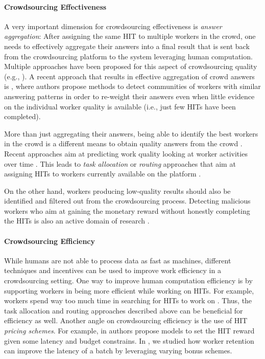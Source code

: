 \paragraph{Crowdsourcing Effectiveness}
A very important dimension for crowdsourcing effectiveness is \emph{answer aggregation}: After assigning the same HIT to multiple workers in the crowd, one needs to effectively aggregate their answers into a final result that is sent back from the crowdsourcing platform to the system leveraging human computation. Multiple approaches have been proposed for this aspect of crowdsourcing quality (e.g.,
\cite{Venanzi:2014:CBA:2566486.2567989,square,zencrowd,Hosseini:2012:ALM:2260641.2260661}).
% 
A recent approach that results in effective aggregation of crowd answers is \cite{Venanzi:2014:CBA:2566486.2567989}, where authors propose methods to detect communities of workers with similar answering patterns in order to re-weight their answers even when little evidence on the individual worker quality is available (i.e., just few HITs have been completed).

More than just aggregating their answers,  being able to identify the best workers in the crowd is a different means to obtain quality answers from the crowd \cite{pickacrowd,bozzon}. 
% 
Recent approaches aim at predicting work quality looking at worker activities over time  \cite{Jung14-hcomp}.
% 
This leads to \emph{task allocation} or \emph{routing} approaches that aim at assigning HITs to  workers currently available on the platform \cite{goel2014mechanism,crowdstar}.

On the other hand, workers producing low-quality results should also be identified and filtered out from the crowdsourcing process.
Detecting malicious workers who aim at gaining the monetary reward without honestly  completing the HITs is also an active domain of research \cite{collusion}.






\paragraph{Crowdsourcing Efficiency}
While humans are not able to process data as fast as machines, different techniques and incentives can be used to improve work efficiency in a crowdsourcing setting.
% 
One way to improve human computation efficiency is by supporting workers in being more efficient while working on HITs. For example, workers spend way too much time in searching for HITs to work on \cite{Kucherbaev:2014:TET:2598153.2602249}. Thus, the task allocation and routing approaches described above can be beneficial for efficiency as well.
% 
Another angle on crowdsourcing efficiency is the use of HIT \emph{pricing schemes}. For example, in \cite{finishthem} authors propose models to set the HIT reward given some latency and budget constrains. In \cite{scaleup}, we studied how worker retention can improve the latency of a batch by leveraging varying bonus schemes.

